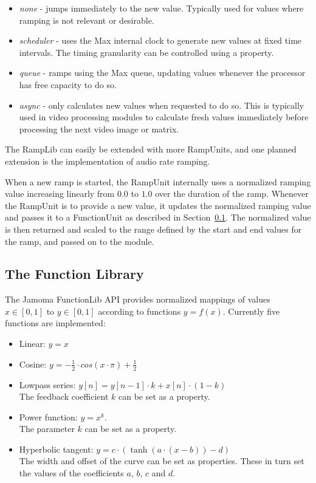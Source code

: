 \documentclass{article}
\begin{document}
\begin{itemize}
	\item \emph{none} - jumps immediately to the new value. Typically used for values where ramping is not relevant or desirable.
	\item \emph{scheduler} - uses the Max internal clock to generate new values at fixed time intervals. The timing granularity can be controlled using a property.
	\item \emph{queue} - ramps using the Max queue, updating values whenever the processor has free capacity to do so.
	\item \emph{async} - only calculates new values when requested to do so. This is typically used in video processing modules to calculate fresh values immediately before processing the next video image or matrix.
\end{itemize}

The RampLib can easily be extended with more RampUnits, and one planned extension is the implementation of audio rate ramping.

When a new ramp is started, the RampUnit internally uses a normalized ramping value increasing linearly from $0.0$ to $1.0$ over the duration of the ramp. Whenever the RampUnit is to provide a new value, it updates the normalized ramping value and passes it to a FunctionUnit as described in Section~\ref{ssec:functionlib}. The normalized value is then returned and scaled to the range defined by the start and end values for the ramp, and passed on to the module.


\subsection{The Function Library} %
\label{ssec:functionlib}

The Jamoma FunctionLib API provides normalized mappings of values $x \in [0,1]$ to $y \in [0,1]$ according to functions $y = f(x)$. Currently five functions are implemented: 

\begin{itemize}
	\item Linear: $y = x$
	\item Cosine: $y = - \frac{1}{2} \cdot cos(x \cdot \pi ) + \frac{1}{2} $
	\item Lowpass series: $y[n] = y[n-1] \cdot k + x[n] \cdot (1-k)$ \\ The feedback coefficient $k$ can be set as a property.
	\item Power function: $ y = x^{k} $. \\ The parameter $k$ can be set as a property.
	\item Hyperbolic tangent: $ y = c \cdot (\tanh(a\cdot(x-b)) - d) $ \\ The width and offset of the curve can be set as properties.  These in turn set the values of the coefficients $a$, $b$, $c$ and $d$.
\end{itemize}
\end{document}
